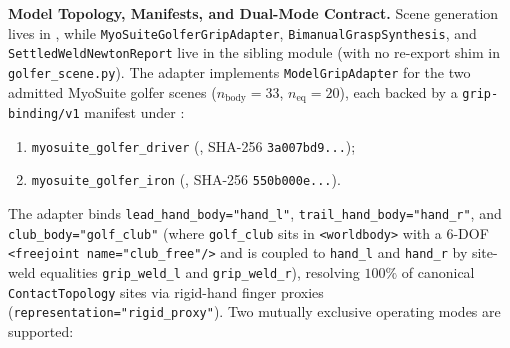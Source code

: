 \documentclass[11pt,a4paper]{article}
\begin{document}
\textbf{Model Topology, Manifests, and Dual-Mode Contract.}
Scene generation lives in , while \texttt{MyoSuiteGolferGripAdapter}, \texttt{BimanualGraspSynthesis}, and \texttt{SettledWeldNewtonReport} live in the sibling module  (with no re-export shim in \texttt{golfer\_scene.py}). The adapter implements \texttt{ModelGripAdapter} for the two admitted MyoSuite golfer scenes ($n_{\mathrm{body}} = 33$, $n_{\mathrm{eq}} = 20$), each backed by a \texttt{grip-binding/v1} manifest under :
\begin{enumerate}[leftmargin=*,noitemsep]
\item \texttt{myosuite\_golfer\_driver} (, SHA-256 \texttt{3a007bd9...});
\item \texttt{myosuite\_golfer\_iron} (, SHA-256 \texttt{550b000e...}).
\end{enumerate}
The adapter binds \texttt{lead\_hand\_body="hand\_l"}, \texttt{trail\_hand\_body="hand\_r"}, and \texttt{club\_body="golf\_club"} (where \texttt{golf\_club} sits in \texttt{<worldbody>} with a 6-DOF \texttt{<freejoint name="club\_free"/>} and is coupled to \texttt{hand\_l} and \texttt{hand\_r} by site-weld equalities \texttt{grip\_weld\_l} and \texttt{grip\_weld\_r}), resolving $100\%$ of canonical \texttt{ContactTopology} sites via rigid-hand finger proxies (\texttt{representation="rigid\_proxy"}). Two mutually exclusive operating modes are supported:
\end{document}
